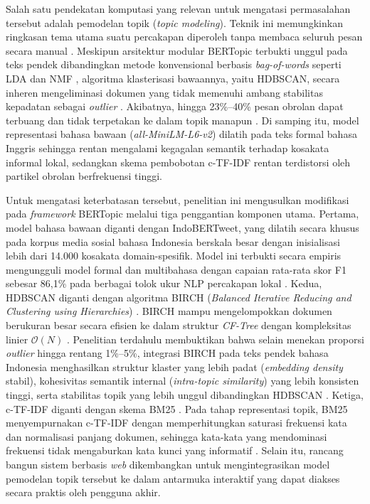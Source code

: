 Salah satu pendekatan komputasi yang relevan untuk mengatasi permasalahan tersebut adalah pemodelan topik (\textit{topic modeling}).
Teknik ini memungkinkan ringkasan tema utama suatu percakapan diperoleh tanpa membaca seluruh pesan secara manual \citep{ABDELRAZEK2023102131}.
Meskipun arsitektur modular BERTopic terbukti unggul pada teks pendek dibandingkan metode konvensional berbasis \textit{bag-of-words} seperti LDA dan NMF \citep{grootendorst2022bertopic,10.3389/fsoc.2022.886498}, algoritma klasterisasi bawaannya, yaitu HDBSCAN, secara inheren mengeliminasi dokumen yang tidak memenuhi ambang stabilitas kepadatan sebagai \textit{outlier} \citep{grootendorst2022bertopic,11271424}.
Akibatnya, hingga 23\%--40\% pesan obrolan dapat terbuang dan tidak terpetakan ke dalam topik manapun \citep{iaes2025indobert}.
Di samping itu, model representasi bahasa bawaan (\textit{all-MiniLM-L6-v2}) dilatih pada teks formal bahasa Inggris sehingga rentan mengalami kegagalan semantik terhadap kosakata informal lokal, sedangkan skema pembobotan c-TF-IDF rentan terdistorsi oleh partikel obrolan berfrekuensi tinggi.

Untuk mengatasi keterbatasan tersebut, penelitian ini mengusulkan modifikasi pada \textit{framework} BERTopic melalui tiga penggantian komponen utama. Pertama, model bahasa bawaan diganti dengan IndoBERTweet, yang dilatih secara khusus pada korpus media sosial bahasa Indonesia berskala besar dengan inisialisasi lebih dari 14.000 kosakata domain-spesifik. Model ini terbukti secara empiris mengungguli model formal dan multibahasa dengan capaian rata-rata skor F1 sebesar 86{,}1\% pada berbagai tolok ukur NLP percakapan lokal \citep{koto2021indobertweet}.
Kedua, HDBSCAN diganti dengan algoritma BIRCH (\textit{Balanced Iterative Reducing and Clustering using Hierarchies}) \citep{10.1145/235968.233324}. BIRCH mampu mengelompokkan dokumen berukuran besar secara efisien ke dalam struktur \textit{CF-Tree} dengan kompleksitas linier $\mathcal{O}(N)$ \citep{10.1145/235968.233324}. Penelitian terdahulu membuktikan bahwa selain menekan proporsi \textit{outlier} hingga rentang 1\%--5\%, integrasi BIRCH pada teks pendek bahasa Indonesia menghasilkan struktur klaster yang lebih padat (\textit{embedding density} stabil), kohesivitas semantik internal (\textit{intra-topic similarity}) yang lebih konsisten tinggi, serta stabilitas topik yang lebih unggul dibandingkan HDBSCAN \citep{Ramadhani_2020,iaes2025indobert}.
Ketiga, c-TF-IDF diganti dengan skema BM25 \citep{doi.org/10.1111/coin.12248}. Pada tahap representasi topik, BM25 menyempurnakan c-TF-IDF dengan memperhitungkan saturasi frekuensi kata dan normalisasi panjang dokumen, sehingga kata-kata yang mendominasi frekuensi tidak mengaburkan kata kunci yang informatif \citep{doi.org/10.1111/coin.12248,iaes2025indobert}.
Selain itu, rancang bangun sistem berbasis \textit{web} dikembangkan untuk mengintegrasikan model pemodelan topik tersebut ke dalam antarmuka interaktif yang dapat diakses secara praktis oleh pengguna akhir.

